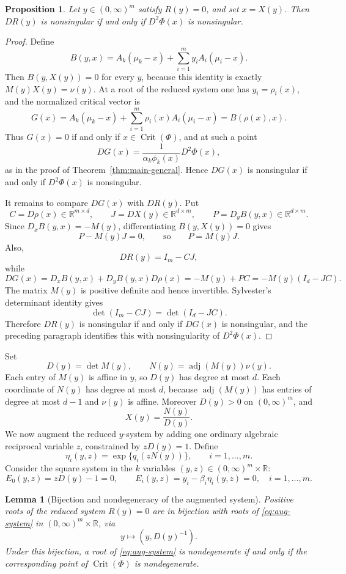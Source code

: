 \documentclass[11pt]{article}
\theoremstyle{plain}
\newtheorem{proposition}[theorem]{Proposition}
\newtheorem{lemma}[theorem]{Lemma}
\theoremstyle{definition}
\theoremstyle{remark}
\numberwithin{equation}{section}
\DeclareMathOperator{\adj}{adj}
\DeclareMathOperator{\Crit}{Crit}
\newcommand{\R}{\mathbb{R}}
\begin{document}
\begin{proposition}\label{prop:reduced-jacobian-hessian}
Let $y\in(0,\infty)^m$ satisfy $R(y)=0$, and set $x=X(y)$. Then $DR(y)$ is nonsingular if and only if $D^2\Phi(x)$ is nonsingular.
\end{proposition}

\begin{proof}
Define
\[
B(y,x)=A_k(\mu_k-x)+\sum_{i=1}^m y_iA_i(\mu_i-x).
\]
Then $B(y,X(y))=0$ for every $y$, because this identity is exactly $M(y)X(y)=\nu(y)$. At a root of the reduced system one has $y_i=\rho_i(x)$, and the normalized critical vector is
\[
G(x)=A_k(\mu_k-x)+\sum_{i=1}^m\rho_i(x)A_i(\mu_i-x)=B(\rho(x),x).
\]
Thus $G(x)=0$ if and only if $x\in\Crit(\Phi)$, and at such a point
\[
DG(x)=\frac{1}{\alpha_k\phi_k(x)}D^2\Phi(x),
\]
as in the proof of Theorem~\ref{thm:main-general}. Hence $DG(x)$ is nonsingular if and only if $D^2\Phi(x)$ is nonsingular.

It remains to compare $DG(x)$ with $DR(y)$. Put
\[
C=D\rho(x)\in\R^{m\times d},
\qquad
J=DX(y)\in\R^{d\times m},
\qquad
P=D_yB(y,x)\in\R^{d\times m}.
\]
Since $D_xB(y,x)=-M(y)$, differentiating $B(y,X(y))=0$ gives
\[
P-M(y)J=0,
\qquad\text{so}\qquad P=M(y)J.
\]
Also,
\[
DR(y)=I_m-CJ,
\]
while
\[
DG(x)=D_xB(y,x)+D_yB(y,x)D\rho(x)=-M(y)+PC
       =-M(y)(I_d-JC).
\]
The matrix $M(y)$ is positive definite and hence invertible. Sylvester's determinant identity gives
\[
\det(I_m-CJ)=\det(I_d-JC).
\]
Therefore $DR(y)$ is nonsingular if and only if $DG(x)$ is nonsingular, and the preceding paragraph identifies this with nonsingularity of $D^2\Phi(x)$.
\end{proof}

Set
\[
D(y)=\det M(y),
\qquad
N(y)=\adj(M(y))\nu(y).
\]
Each entry of $M(y)$ is affine in $y$, so $D(y)$ has degree at most $d$. Each coordinate of $N(y)$ has degree at most $d$, because $\adj(M(y))$ has entries of degree at most $d-1$ and $\nu(y)$ is affine. Moreover $D(y)>0$ on $(0,\infty)^m$, and
\[
X(y)=\frac{N(y)}{D(y)}.
\]
We now augment the reduced $y$-system by adding one ordinary algebraic reciprocal variable $z$, constrained by $zD(y)=1$. Define
\[
\eta_i(y,z)=\exp\{q_i(zN(y))\},
\qquad i=1,\dots,m.
\]
Consider the square system in the $k$ variables $(y,z)\in(0,\infty)^m\times\R$:
\begin{equation}\label{eq:aug-system}
E_0(y,z)=zD(y)-1=0,
\qquad
E_i(y,z)=y_i-\beta_i\eta_i(y,z)=0,\quad i=1,\dots,m.
\end{equation}

\begin{lemma}[Bijection and nondegeneracy of the augmented system]\label{lem:aug-bijection}
Positive roots of the reduced system $R(y)=0$ are in bijection with roots of \eqref{eq:aug-system} in $(0,\infty)^m\times\R$, via
\[
y\longmapsto (y,D(y)^{-1}).
\]
Under this bijection, a root of \eqref{eq:aug-system} is nondegenerate if and only if the corresponding point of $\Crit(\Phi)$ is nondegenerate.
\end{lemma}
\end{document}
